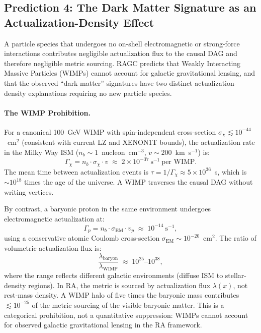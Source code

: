 \documentclass[11pt,a4paper]{article}
\theoremstyle{plain}
\theoremstyle{definition}
\theoremstyle{remark}
\begin{document}

\subsection{Prediction 4: The Dark Matter Signature as an Actualization-Density
Effect}
\label{sec:pred4}

A particle species that undergoes no on-shell electromagnetic or strong-force
interactions contributes negligible actualization flux to the causal DAG and
therefore negligible metric sourcing. RAGC predicts that Weakly Interacting
Massive Particles (WIMPs) cannot account for galactic gravitational lensing, and
that the observed ``dark matter'' signatures have two distinct actualization-density
explanations requiring no new particle species.

\paragraph{The WIMP Prohibition.}
For a canonical 100~GeV WIMP with spin-independent cross-section
$\sigma_\chi \lesssim 10^{-44}$~cm$^2$ (consistent with current LZ and XENON1T
bounds), the actualization rate in the Milky Way ISM
($n_b \sim 1$~nucleon~cm$^{-3}$, $v \sim 200$~km~s$^{-1}$) is:
\begin{equation}
  \Gamma_\chi = n_b \cdot \sigma_\chi \cdot v
  \;\approx\; 2 \times 10^{-37}~\text{s}^{-1}~\text{per WIMP.}
  \label{eq:wimp_rate}
\end{equation}
The mean time between actualization events is $\tau = 1/\Gamma_\chi \approx
5 \times 10^{36}$~s, which is $\sim\!10^{18}$ times the age of the universe.
A WIMP traverses the causal DAG without writing vertices.

By contrast, a baryonic proton in the same environment undergoes electromagnetic
actualization at:
\begin{equation}
  \Gamma_p = n_b \cdot \sigma_{\mathrm{EM}} \cdot v_p
  \;\approx\; 10^{-14}~\text{s}^{-1},
  \label{eq:proton_rate}
\end{equation}
using a conservative atomic Coulomb cross-section $\sigma_{\mathrm{EM}} \sim
10^{-20}$~cm$^2$. The ratio of volumetric actualization flux is:
\begin{equation}
  \frac{\lambda_{\mathrm{baryon}}}{\lambda_{\mathrm{WIMP}}}
  \;\approx\; 10^{25}\text{--}10^{38},
  \label{eq:flux_ratio}
\end{equation}
where the range reflects different galactic environments (diffuse ISM to
stellar-density regions). In RA, the metric is sourced by actualization flux
$\lambda(x)$, not rest-mass density. A WIMP halo of five times the baryonic mass
contributes $\lesssim 10^{-25}$ of the metric sourcing of the visible baryonic
matter. This is a categorical prohibition, not a quantitative suppression: WIMPs
cannot account for observed galactic gravitational lensing in the RA framework.
\end{document}

